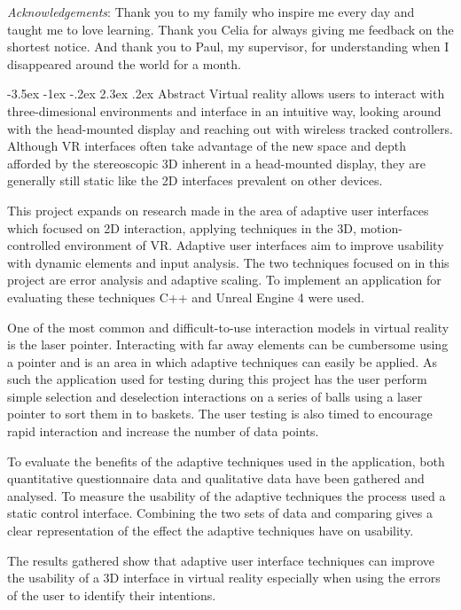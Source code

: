 \documentclass[12pt]{article}
\makeatletter
\renewcommand{\section}{\@startsection {section}{1}{\z@}%
             {-3.5ex \@plus -1ex \@minus -.2ex}%
             {2.3ex \@plus .2ex}%
             {\normalfont\Large\scshape\bfseries}}
\makeatother
\begin{document}
\emph{Acknowledgements}: Thank you to my family who inspire me every day and taught me to love learning. Thank you Celia for always giving me feedback on the shortest notice. And thank you to Paul, my supervisor, for understanding when I disappeared around the world for a month.

\pagebreak

\setcounter{page}{1}

\section{Abstract}
Virtual reality allows users to interact with three-dimesional environments and interface in an intuitive way, looking around with the head-mounted display and reaching out with wireless tracked controllers. Although VR interfaces often take advantage of the new space and depth afforded by the stereoscopic 3D inherent in a head-mounted display, they are generally still static like the 2D interfaces prevalent on other devices.

This project expands on research made in the area of adaptive user interfaces which focused on 2D interaction, applying techniques in the 3D, motion-controlled environment of VR. Adaptive user interfaces aim to improve usability with dynamic elements and input analysis. The two techniques focused on in this project are error analysis and adaptive scaling. To implement an application for evaluating these techniques C++ and Unreal Engine 4 were used.

One of the most common and difficult-to-use interaction models in virtual reality is the laser pointer. Interacting with far away elements can be cumbersome using a pointer and is an area in which adaptive techniques can easily be applied. As such the application used for testing during this project has the user perform simple selection and deselection interactions on a series of balls using a laser pointer to sort them in to baskets. The user testing is also timed to encourage rapid interaction and increase the number of data points.

To evaluate the benefits of the adaptive techniques used in the application, both quantitative questionnaire data and qualitative data have been gathered and analysed. To measure the usability of the adaptive techniques the process used a static control interface. Combining the two sets of data and comparing gives a clear representation of the effect the adaptive techniques have on usability.

The results gathered show that adaptive user interface techniques can improve the usability of a 3D interface in virtual reality especially when using the errors of the user to identify their intentions.
\end{document}

